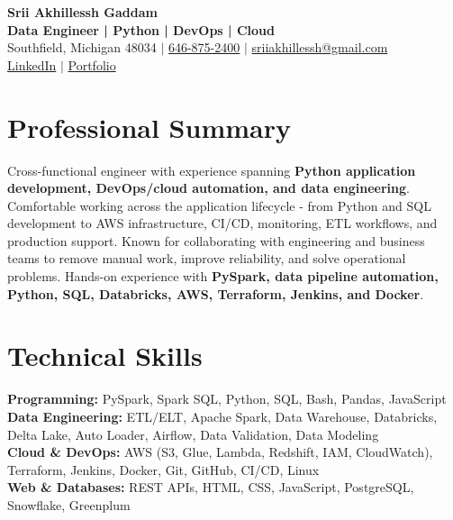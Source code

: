 \documentclass[letterpaper,10pt]{article}
\begin{document}
\fontsize{9.35pt}{10.45pt}\selectfont

\begin{center}
    {\LARGE \textbf{Srii Akhillessh Gaddam}} \\[-1pt]
    \textbf{Data Engineer | Python | DevOps | Cloud} \\[2pt]
    Southfield, Michigan 48034 $|$
    \href{tel:6468752400}{646-875-2400} $|$
    \href{mailto:sriiakhillessh@gmail.com}{sriiakhillessh@gmail.com} \\[1pt]
    \href{https://www.linkedin.com/in/srii-akhiilessh-gaddam-b48668191/}{LinkedIn} $|$
    \href{https://sriiakhillesshg.github.io/portfolio/}{Portfolio}
\end{center}
\vspace{-8pt}

\section{Professional Summary}
\small{Cross-functional engineer with experience spanning \textbf{Python application development, DevOps/cloud automation, and data engineering}. Comfortable working across the application lifecycle - from Python and SQL development to AWS infrastructure, CI/CD, monitoring, ETL workflows, and production support. Known for collaborating with engineering and business teams to remove manual work, improve reliability, and solve operational problems. Hands-on experience with \textbf{PySpark, data pipeline automation, Python, SQL, Databricks, AWS, Terraform, Jenkins, and Docker}.}

\section{Technical Skills}
\small{
\textbf{Programming:} PySpark, Spark SQL, Python, SQL, Bash, Pandas, JavaScript \\
\textbf{Data Engineering:} ETL/ELT, Apache Spark, Data Warehouse, Databricks, Delta Lake, Auto Loader, Airflow, Data Validation, Data Modeling \\
\textbf{Cloud \& DevOps:} AWS (S3, Glue, Lambda, Redshift, IAM, CloudWatch), Terraform, Jenkins, Docker, Git, GitHub, CI/CD, Linux \\
\textbf{Web \& Databases:} REST APIs, HTML, CSS, JavaScript, PostgreSQL, Snowflake, Greenplum
}
\end{document}
